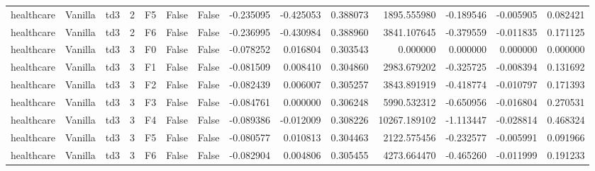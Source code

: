 \begin{tabular}{lllrlllrrrrrrr}
healthcare & Vanilla &       td3 &     2 &  F5 &           False &            False & -0.235095 & -0.425053 & 0.388073 &      1895.555980 &          -0.189546 &       -0.005905 &            0.082421 \\
healthcare & Vanilla &       td3 &     2 &  F6 &           False &            False & -0.236995 & -0.430984 & 0.388960 &      3841.107645 &          -0.379559 &       -0.011835 &            0.171125 \\
healthcare & Vanilla &       td3 &     3 &  F0 &           False &            False & -0.078252 &  0.016804 & 0.303543 &         0.000000 &           0.000000 &        0.000000 &            0.000000 \\
healthcare & Vanilla &       td3 &     3 &  F1 &           False &            False & -0.081509 &  0.008410 & 0.304860 &      2983.679202 &          -0.325725 &       -0.008394 &            0.131692 \\
healthcare & Vanilla &       td3 &     3 &  F2 &           False &            False & -0.082439 &  0.006007 & 0.305257 &      3843.891919 &          -0.418774 &       -0.010797 &            0.171393 \\
healthcare & Vanilla &       td3 &     3 &  F3 &           False &            False & -0.084761 &  0.000000 & 0.306248 &      5990.532312 &          -0.650956 &       -0.016804 &            0.270531 \\
healthcare & Vanilla &       td3 &     3 &  F4 &           False &            False & -0.089386 & -0.012009 & 0.308226 &     10267.189102 &          -1.113447 &       -0.028814 &            0.468324 \\
healthcare & Vanilla &       td3 &     3 &  F5 &           False &            False & -0.080577 &  0.010813 & 0.304463 &      2122.575456 &          -0.232577 &       -0.005991 &            0.091966 \\
healthcare & Vanilla &       td3 &     3 &  F6 &           False &            False & -0.082904 &  0.004806 & 0.305455 &      4273.664470 &          -0.465260 &       -0.011999 &            0.191233 \\
\bottomrule
\end{tabular}
